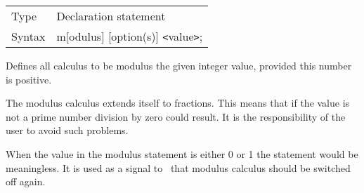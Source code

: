 \noindent \begin{tabular}{ll}
Type & Declaration statement\\
Syntax & m[odulus] [option(s)] {\tt<}value{\tt>};
\end{tabular} \vspace{4mm}

\noindent Defines all calculus to be modulus the given 
integer value, provided this number is positive.


\noindent The modulus calculus extends itself to 
fractions. This means that if the value is not a prime 
number division by zero could result. It is the responsibility of the user 
to avoid such problems.

\noindent When the value in the modulus statement is either 0 or 1 the 
statement would be meaningless. It is used as a signal to \FORM\ that modulus 
calculus should be switched off again.

